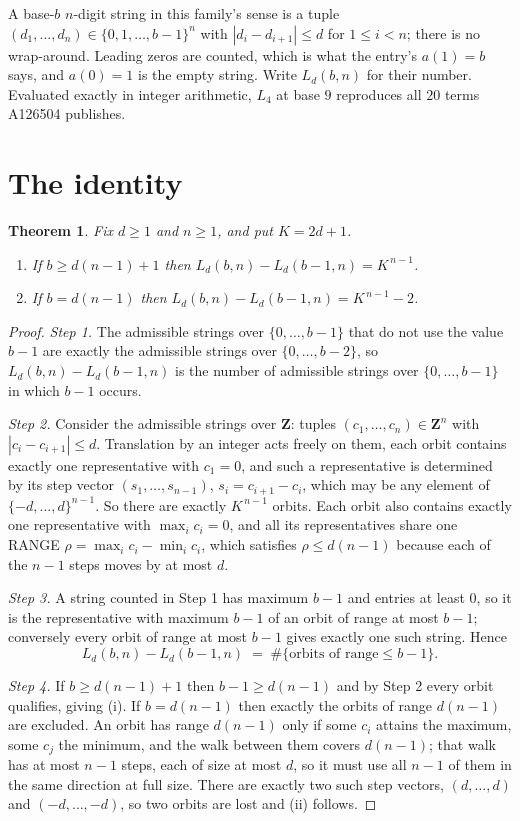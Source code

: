 \documentclass[11pt,a4paper]{article}
\theoremstyle{plain}
\newtheorem{theorem}{Theorem}
\theoremstyle{definition}
\begin{document}
A base-$b$ $n$-digit string in this family's sense is a tuple
$(d_1,\dots,d_n)\in\{0,1,\dots,b-1\}^{n}$ with $|d_i-d_{i+1}|\le d$ for $1\le i<n$; there
is no wrap-around. Leading zeros are counted, which is what the entry's $a(1)=b$ says, and
$a(0)=1$ is the empty string. Write $L_d(b,n)$ for their number. Evaluated exactly in integer
arithmetic, $L_{4}$ at base $9$ reproduces all $20$ terms A126504 publishes.

\section{The identity}

\begin{theorem}
Fix $d\ge1$ and $n\ge1$, and put $K=2d+1$.
\begin{enumerate}
\item[(i)] If $b\ge d(n-1)+1$ then $L_d(b,n)-L_d(b-1,n)=K^{\,n-1}$.
\item[(ii)] If $b=d(n-1)$ then $L_d(b,n)-L_d(b-1,n)=K^{\,n-1}-2$.
\end{enumerate}
\end{theorem}

\begin{proof}
\emph{Step 1.} The admissible strings over $\{0,\dots,b-1\}$ that do not use the value $b-1$
are exactly the admissible strings over $\{0,\dots,b-2\}$, so $L_d(b,n)-L_d(b-1,n)$ is the
number of admissible strings over $\{0,\dots,b-1\}$ in which $b-1$ occurs.

\emph{Step 2.} Consider the admissible strings over $\mathbf{Z}$: tuples
$(c_1,\dots,c_n)\in\mathbf{Z}^{n}$ with $|c_i-c_{i+1}|\le d$. Translation by an integer acts
freely on them, each orbit contains exactly one representative with $c_1=0$, and such a
representative is determined by its step vector $(s_1,\dots,s_{n-1})$, $s_i=c_{i+1}-c_i$,
which may be any element of $\{-d,\dots,d\}^{n-1}$. So there are exactly $K^{\,n-1}$ orbits.
Each orbit also contains exactly one representative with $\max_i c_i=0$, and all its
representatives share one RANGE $\rho=\max_ic_i-\min_ic_i$, which satisfies
$\rho\le d(n-1)$ because each of the $n-1$ steps moves by at most $d$.

\emph{Step 3.} A string counted in Step 1 has maximum $b-1$ and entries at least $0$, so it is
the representative with maximum $b-1$ of an orbit of range at most $b-1$; conversely every orbit
of range at most $b-1$ gives exactly one such string. Hence
\[
L_d(b,n)-L_d(b-1,n)\;=\;\#\{\text{orbits of range}\le b-1\} .
\]

\emph{Step 4.} If $b\ge d(n-1)+1$ then $b-1\ge d(n-1)$ and by Step 2 every orbit qualifies,
giving (i). If $b=d(n-1)$ then exactly the orbits of range $d(n-1)$ are excluded. An orbit has
range $d(n-1)$ only if some $c_i$ attains the maximum, some $c_j$ the minimum, and the walk
between them covers $d(n-1)$; that walk has at most $n-1$ steps, each of size at most $d$, so it
must use all $n-1$ of them in the same direction at full size. There are exactly two such step
vectors, $(d,\dots,d)$ and $(-d,\dots,-d)$, so two orbits are lost and (ii) follows.
\end{proof}
\end{document}
